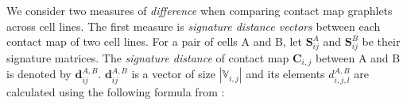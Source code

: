 \documentclass[a4,center,fleqn]{NAR}
\begin{document}
%


We consider two measures of \textit{difference} when comparing contact
map graphlets across cell lines. 
The first measure is \textit{signature distance vectors} between
each contact map of two cell lines. 
For a pair of cells A and B, let 
$\mathbf{S}^A_{ij}$  and $\mathbf{S}^B_{ij}$ be their
signature matrices. The \textit{signature distance} of
contact map $\mathbf{C}_{i,j}$ between A and B is denoted
by $\mathbf{d}^{\scriptscriptstyle A,B}_{ij}$. $\mathbf{d}^{\scriptscriptstyle A,B}_{ij}$ 
is a vector of size $|\mathbb{V}_{i,j}|$
and its elements $d^{\scriptscriptstyle A,B}_{i,j,l}$ are
calculated using the following formula from \cite{prvzulj2007biological}:
\end{document}
